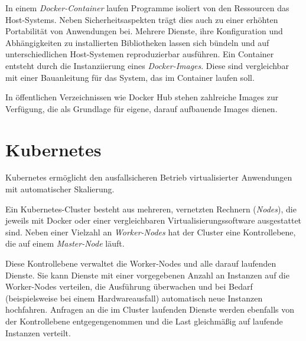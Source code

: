 In einem \emph{Docker-Container} laufen Programme isoliert von den Ressourcen das Host-Systems.
Neben Sicherheitsaspekten trägt dies auch zu einer erhöhten Portabilität von Anwendungen bei.
Mehrere Dienste, ihre Konfiguration und Abhängigkeiten zu installierten Bibliotheken lassen sich bündeln und auf unterschiedlichen Host-Systemen reproduzierbar ausführen.
Ein Container entsteht durch die Instanziierung eines \emph{Docker-Images}.
Diese sind vergleichbar mit einer Bauanleitung für das System, das im Container laufen soll.

In öffentlichen Verzeichnissen wie Docker Hub stehen zahlreiche Images zur Verfügung, die als Grundlage für eigene, darauf aufbauende Images dienen.

\section{Kubernetes}\label{sec:kubernetes}

Kubernetes ermöglicht den ausfallsicheren Betrieb virtualisierter Anwendungen mit automatischer Skalierung.

Ein Kubernetes-Cluster besteht aus mehreren, vernetzten Rechnern (\emph{Nodes}), die jeweils mit Docker oder einer vergleichbaren Virtualisierungssoftware ausgestattet sind.
Neben einer Vielzahl an \emph{Worker-Nodes} hat der Cluster eine Kontrollebene, die auf einem \emph{Master-Node} läuft.

Diese Kontrollebene verwaltet die Worker-Nodes und alle darauf laufenden Dienste.
Sie kann Dienste mit einer vorgegebenen Anzahl an Instanzen auf die Worker-Nodes verteilen, die Ausführung überwachen und bei Bedarf (beispielsweise bei einem Hardwareausfall) automatisch neue Instanzen hochfahren.
Anfragen an die im Cluster laufenden Dienste werden ebenfalls von der Kontrollebene entgegengenommen und die Last gleichmäßig auf laufende Instanzen verteilt.
